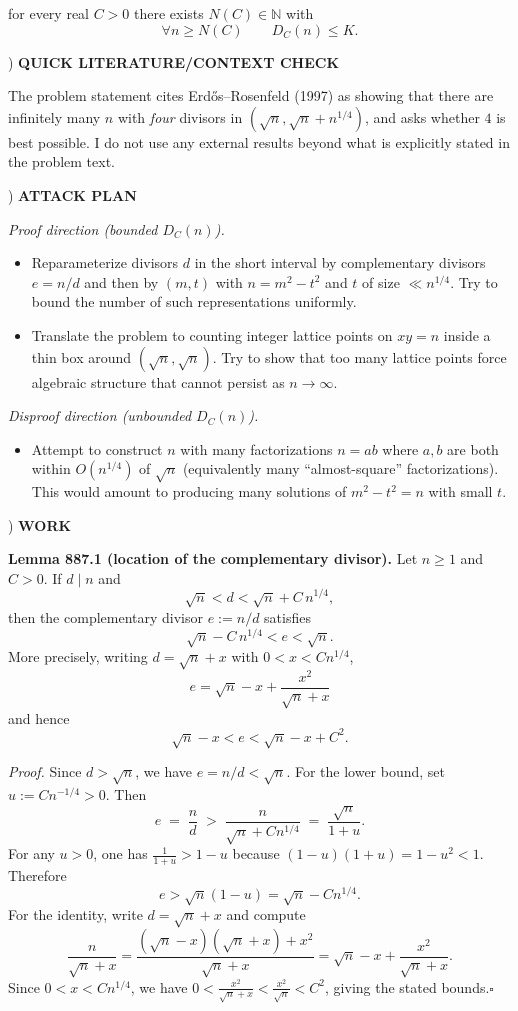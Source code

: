 \noindent for every real $C>0$ there exists $N(C)\in\mathbb{N}$ with
\[
\forall n\ge N(C)\qquad D_C(n)\le K.
\]

) \textbf{QUICK LITERATURE/CONTEXT CHECK}

\noindent The problem statement cites Erd\H{o}s--Rosenfeld (1997) as showing that there are infinitely many $n$ with \emph{four} divisors in $(\sqrt n,\sqrt n+n^{1/4})$, and asks whether $4$ is best possible. I do not use any external results beyond what is explicitly stated in the problem text.

) \textbf{ATTACK PLAN}

\noindent \emph{Proof direction (bounded $D_C(n)$).}
\begin{itemize}
\item Reparameterize divisors $d$ in the short interval by complementary divisors $e=n/d$ and then by $(m,t)$ with $n=m^2-t^2$ and $t$ of size $\ll n^{1/4}$. Try to bound the number of such representations uniformly.
\item Translate the problem to counting integer lattice points on $xy=n$ inside a thin box around $(\sqrt n,\sqrt n)$. Try to show that too many lattice points force algebraic structure that cannot persist as $n\to\infty$.
\end{itemize}

\noindent \emph{Disproof direction (unbounded $D_C(n)$).}
\begin{itemize}
\item Attempt to construct $n$ with many factorizations $n=ab$ where $a,b$ are both within $O(n^{1/4})$ of $\sqrt n$ (equivalently many ``almost-square'' factorizations). This would amount to producing many solutions of $m^2-t^2=n$ with small $t$.
\end{itemize}

) \textbf{WORK}

\noindent \textbf{Lemma 887.1 (location of the complementary divisor).}
Let $n\ge 1$ and $C>0$. If $d\mid n$ and
\[\sqrt n< d < \sqrt n + C\,n^{1/4},\]
then the complementary divisor $e:=n/d$ satisfies
\[\sqrt n - C\,n^{1/4} < e < \sqrt n.\]
More precisely, writing $d=\sqrt n + x$ with $0<x<Cn^{1/4}$,
\[
 e = \sqrt n - x + \frac{x^2}{\sqrt n + x}
\]
and hence
\[\sqrt n - x < e < \sqrt n - x + C^2.\]

\noindent\emph{Proof.}
Since $d>\sqrt n$, we have $e=n/d<\sqrt n$.
For the lower bound, set $u:=C n^{-1/4}>0$. Then
\[
 e \;=\; \frac{n}{d}\;>\; \frac{n}{\sqrt n + Cn^{1/4}} 
 \;=\; \frac{\sqrt n}{1+u}.
\]
For any $u>0$, one has $\frac{1}{1+u} > 1-u$ because
$(1-u)(1+u)=1-u^2<1$. Therefore
\[
 e > \sqrt n(1-u)=\sqrt n - Cn^{1/4}.
\]
For the identity, write $d=\sqrt n + x$ and compute
\[
\frac{n}{\sqrt n + x}
= \frac{(\sqrt n - x)(\sqrt n + x) + x^2}{\sqrt n + x}
= \sqrt n - x + \frac{x^2}{\sqrt n + x}.
\]
Since $0<x<Cn^{1/4}$, we have $0<\frac{x^2}{\sqrt n + x} < \frac{x^2}{\sqrt n} < C^2$, giving the stated bounds.\hfill$\square$

